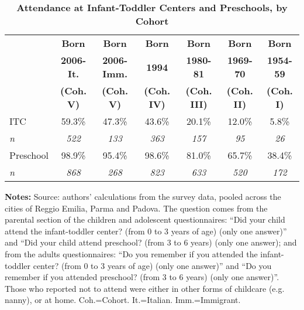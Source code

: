 \begin{table}[!ht]
\footnotesize
\caption{\textbf{Attendance at Infant-Toddler Centers and Preschools, by Cohort}}
\label{tab:Attendance}
\begin{center}
\scriptsize
\begin{tabular}{ l c c c c c c }
\hline\hline
& \textbf{Born} & \textbf{Born} & \textbf{Born} & \textbf{Born} & \textbf{Born} & \textbf{Born}\\
& \textbf{2006-It.} & \textbf{2006-Imm.} & \textbf{1994} & \textbf{1980-81} & \textbf{1969-70} & \textbf{1954-59}\\
& \textbf{(Coh. V)} & \textbf{(Coh. V)} & \textbf{(Coh. IV)} & \textbf{(Coh. III)} & \textbf{(Coh. II)} & \textbf{(Coh. I)}\\
\hline
ITC & 59.3\% & 47.3\% & 43.6\% & 20.1\% & 12.0\% & 5.8\% \\[0.2em]
\textit{n}                    & \textit{522} & \textit{133} & \textit{363} & \textit{157} & \textit{95} & \textit{26}\\[0.2em]
\hline
Preschool             & 98.9\% & 95.4\% & 98.6\% & 81.0\% & 65.7\% & 38.4\% \\[0.2em]
\textit{n}                     & \textit{868} & \textit{268} & \textit{823} & \textit{633} & \textit{520} & \textit{172}\\[0.2em]
\hline
\end{tabular}
\end{center}
\begin{flushleft}
\tiny{{\bfseries Notes:} Source: authors' calculations from the survey data, pooled across the cities of Reggio Emilia, Parma and Padova. The question comes from the parental section of the children and adolescent questionnaires: ``Did your child attend the infant-toddler center? (from 0 to 3 years of age) (only one answer)'' and ``Did your child attend preschool? (from 3 to 6 years) (only one answer); and from the adults questionnaires: ``Do you remember if you attended the infant-toddler center? (from 0 to 3 years of age) (only one answer)'' and ``Do you remember if you attended preschool? (from 3 to 6 years) (only one answer)''. Those who reported not to attend were either in other forms of childcare (e.g. nanny), or at home. Coh.=Cohort. It.=Italian. Imm.=Immigrant.}
\end{flushleft}
\end{table}

